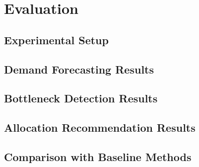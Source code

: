 \chapter{Evaluation}
\label{chap:evaluation}

\section{Experimental Setup}
\label{sec:exp_setup}


\section{Demand Forecasting Results}
\label{sec:forecast_results}


\section{Bottleneck Detection Results}
\label{sec:bottleneck_results}


\section{Allocation Recommendation Results}
\label{sec:allocation_results}


\section{Comparison with Baseline Methods}
\label{sec:baseline_comparison}

